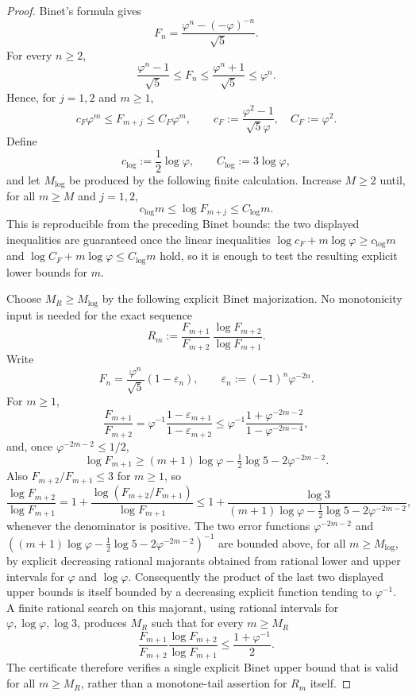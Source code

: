 \begin{proof}
  Binet's formula gives
  \[
    F_n=\frac{\varphi^n-(-\varphi)^{-n}}{\sqrt5}.
  \]
  For every \(n\ge2\),
  \[
    \frac{\varphi^n-1}{\sqrt5}\le F_n\le
    \frac{\varphi^n+1}{\sqrt5}\le \varphi^n.
  \]
  Hence, for \(j=1,2\) and \(m\ge1\),
  \[
    c_F\varphi^m\le F_{m+j}\le C_F\varphi^m,\qquad
    c_F:=\frac{\varphi^2-1}{\sqrt5\varphi},\quad
    C_F:=\varphi^2.
  \]
  Define
  \[
    c_{\log}:=\frac12\log\varphi,\qquad C_{\log}:=3\log\varphi,
  \]
  and let \(M_{\log}\) be produced by the following finite calculation.
  Increase \(M\ge2\) until, for all \(m\ge M\) and \(j=1,2\),
  \[
    c_{\log}m\le \log F_{m+j}\le C_{\log}m.
  \]
  This is reproducible from the preceding Binet bounds: the two
  displayed inequalities are guaranteed once the linear inequalities
  \(\log c_F+m\log\varphi\ge c_{\log}m\) and
  \(\log C_F+m\log\varphi\le C_{\log}m\) hold, so it is enough to test
  the resulting explicit lower bounds for \(m\).

  Choose \(M_R\ge M_{\log}\) by the following explicit Binet
  majorization. No monotonicity input is needed for the exact sequence
  \[
    R_m
    :=
    \frac{F_{m+1}}{F_{m+2}}\,
    \frac{\log F_{m+2}}{\log F_{m+1}}.
  \]
  Write
  \[
    F_n=\frac{\varphi^n}{\sqrt5}(1-\varepsilon_n),
    \qquad
    \varepsilon_n:=(-1)^n\varphi^{-2n}.
  \]
  For \(m\ge1\),
  \[
    \frac{F_{m+1}}{F_{m+2}}
    =
    \varphi^{-1}
    \frac{1-\varepsilon_{m+1}}{1-\varepsilon_{m+2}}
    \le
    \varphi^{-1}
    \frac{1+\varphi^{-2m-2}}{1-\varphi^{-2m-4}},
  \]
  and, once \(\varphi^{-2m-2}\le1/2\),
  \[
    \log F_{m+1}
    \ge
    (m+1)\log\varphi-\tfrac12\log5-2\varphi^{-2m-2}.
  \]
  Also \(F_{m+2}/F_{m+1}\le3\) for \(m\ge1\), so
  \[
    \frac{\log F_{m+2}}{\log F_{m+1}}
    =
    1+\frac{\log(F_{m+2}/F_{m+1})}{\log F_{m+1}}
    \le
    1+
    \frac{\log3}
    {(m+1)\log\varphi-\tfrac12\log5-2\varphi^{-2m-2}},
  \]
  whenever the denominator is positive. The two error functions
  \(\varphi^{-2m-2}\) and
  \(((m+1)\log\varphi-\tfrac12\log5-2\varphi^{-2m-2})^{-1}\) are bounded
  above, for all \(m\ge M_{\log}\), by explicit decreasing rational
  majorants obtained from rational lower and upper intervals for
  \(\varphi\) and \(\log\varphi\). Consequently the product of the last
  two displayed upper bounds is itself bounded by a decreasing explicit
  function tending to \(\varphi^{-1}\). A finite rational search on this
  majorant, using rational intervals for \(\varphi,\log\varphi,\log3\),
  produces \(M_R\) such that for every \(m\ge M_R\)
  \[
    \frac{F_{m+1}}{F_{m+2}}
      \frac{\log F_{m+2}}{\log F_{m+1}}
    \le\frac{1+\varphi^{-1}}2 .
  \]
  The certificate therefore verifies a single explicit Binet upper bound
  that is valid for all \(m\ge M_R\), rather than a monotone-tail
  assertion for \(R_m\) itself.


\end{proof}
